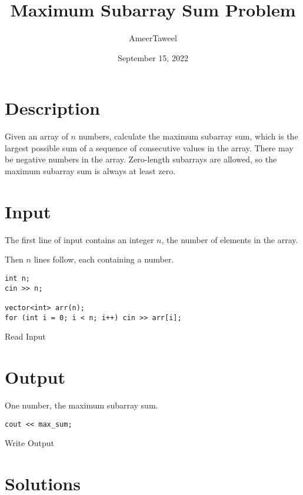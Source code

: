 \documentclass[12pt, a4paper]{article}
\title{Maximum Subarray Sum Problem}
\author{AmeerTaweel}
\date{September 15, 2022}
\begin{document}
\maketitle

\newpage

\tableofcontents

\newpage

\section{Description}

Given an array of $n$ numbers, calculate the maximum subarray sum, which is the
largest possible sum of a sequence of consecutive values in the array. There may
be negative numbers in the array. Zero-length subarrays are allowed, so the
maximum subarray sum is always at least zero.

\section{Input}

The first line of input contains an integer $n$, the number of elements in the
array.

Then $n$ lines follow, each containing a number.

\begin{listing}[!ht]
\begin{verbatim}
int n;
cin >> n;

vector<int> arr(n);
for (int i = 0; i < n; i++) cin >> arr[i];
\end{verbatim}
\caption{Read Input}
\label{listing:in}
\end{listing}

\section{Output}

One number, the maximum subarray sum.

\begin{listing}[!ht]
\begin{verbatim}
cout << max_sum;
\end{verbatim}
\caption{Write Output}
\label{listing:out}
\end{listing}

\newpage

\section{Solutions}
\end{document}
